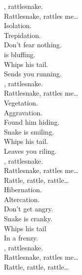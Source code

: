 
\label{album:flying-microtonal-banana}





, rattlesnake. \\
Rattlesnake, rattles me… \\

Isolation. \\
Trepidation. \\
Don't fear nothing. \\
 is bluffing. \\
Whips his tail. \\
Sends you running. \\

, rattlesnake. \\
Rattlesnake, rattles me… \\

Vegetation. \\
Aggravation. \\
Found him hiding. \\
Snake is smiling. \\
Whips his tail. \\
Leaves you riling. \\

, rattlesnake. \\
Rattlesnake, rattles me… \\

Rattle, rattle, rattle… \\

Hibernation. \\
Altercation. \\
Don't get angry. \\
Snake is cranky. \\
Whips his tail \\
In a frenzy. \\

, rattlesnake. \\
Rattlesnake, rattles me… \\

Rattle, rattle, rattle… \\

